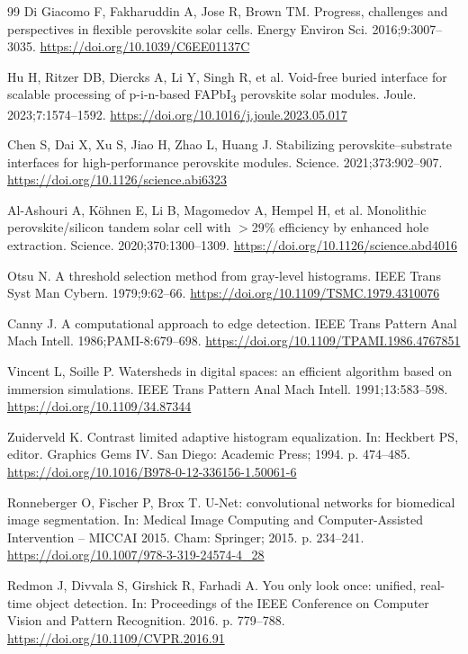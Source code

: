 \documentclass[pdflatex,sn-mathphys-num,iicol]{sn-jnl}
\theoremstyle{thmstyleone}
\theoremstyle{thmstyletwo}
\theoremstyle{thmstylethree}
\begin{document}
\begin{thebibliography}{99}
Di Giacomo F, Fakharuddin A, Jose R, Brown TM.
Progress, challenges and perspectives in flexible perovskite solar cells.
Energy Environ Sci. 2016;9:3007--3035.
\url{https://doi.org/10.1039/C6EE01137C}

Hu H, Ritzer DB, Diercks A, Li Y, Singh R, et al.
Void-free buried interface for scalable processing of p-i-n-based
FAPbI\textsubscript{3} perovskite solar modules.
Joule. 2023;7:1574--1592.
\url{https://doi.org/10.1016/j.joule.2023.05.017}

Chen S, Dai X, Xu S, Jiao H, Zhao L, Huang J.
Stabilizing perovskite--substrate interfaces for high-performance
perovskite modules.
Science. 2021;373:902--907.
\url{https://doi.org/10.1126/science.abi6323}

Al-Ashouri A, K\"{o}hnen E, Li B, Magomedov A, Hempel H, et al.
Monolithic perovskite/silicon tandem solar cell with $>$29\% efficiency
by enhanced hole extraction.
Science. 2020;370:1300--1309.
\url{https://doi.org/10.1126/science.abd4016}

Otsu N.
A threshold selection method from gray-level histograms.
IEEE Trans Syst Man Cybern. 1979;9:62--66.
\url{https://doi.org/10.1109/TSMC.1979.4310076}

Canny J.
A computational approach to edge detection.
IEEE Trans Pattern Anal Mach Intell. 1986;PAMI-8:679--698.
\url{https://doi.org/10.1109/TPAMI.1986.4767851}

Vincent L, Soille P.
Watersheds in digital spaces: an efficient algorithm based on
immersion simulations.
IEEE Trans Pattern Anal Mach Intell. 1991;13:583--598.
\url{https://doi.org/10.1109/34.87344}

Zuiderveld K.
Contrast limited adaptive histogram equalization.
In: Heckbert PS, editor. Graphics Gems IV.
San Diego: Academic Press; 1994. p. 474--485.
\url{https://doi.org/10.1016/B978-0-12-336156-1.50061-6}

Ronneberger O, Fischer P, Brox T.
U-Net: convolutional networks for biomedical image segmentation.
In: Medical Image Computing and Computer-Assisted Intervention --
MICCAI 2015.
Cham: Springer; 2015. p. 234--241.
\url{https://doi.org/10.1007/978-3-319-24574-4_28}

Redmon J, Divvala S, Girshick R, Farhadi A.
You only look once: unified, real-time object detection.
In: Proceedings of the IEEE Conference on Computer Vision and
Pattern Recognition. 2016. p. 779--788.
\url{https://doi.org/10.1109/CVPR.2016.91}


\end{thebibliography}
\end{document}
